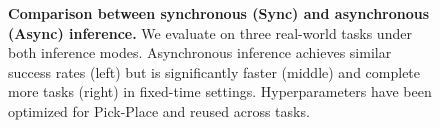 \begin{figure}[h!]
    \caption{\textbf{Comparison between synchronous (Sync) and asynchronous (Async) inference.} We evaluate \ours on three real-world tasks under both inference modes. Asynchronous inference achieves similar success rates (left) but is significantly faster (middle) and complete more tasks (right) in fixed-time settings. Hyperparameters have been optimized for Pick-Place and reused across tasks.}
    \label{fig:async_inference_summary}
\end{figure}

